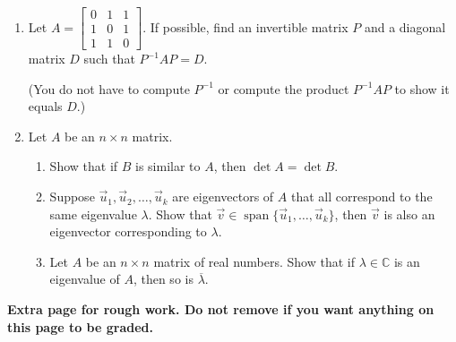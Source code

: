 \documentclass[12pt]{article}
\newcommand{\points}[1]{\marginpar{\hspace{24pt}[#1]}}
\begin{document}
\begin{enumerate}
\item Let $A=\begin{bmatrix}0&1&1\\1&0&1\\1&1&0\end{bmatrix}$.\points{10} If possible, find an invertible matrix $P$ and a diagonal matrix $D$ such that $P^{-1}AP=D$.

(You do not have to compute $P^{-1}$ or compute the product $P^{-1}AP$ to show it equals $D$.)

\newpage

\item Let $A$ be an $n\times n$ matrix.
\begin{enumerate}
 \item Show that if $B$ is similar to $A$, then $\det A = \det B$. \points{3}

\vspace{2in}

 \item Suppose $\vec{u}_1,\vec{u}_2,\ldots, \vec{u}_k$ are eigenvectors of $A$ that all correspond to the same eigenvalue $\lambda$. Show that $\vec{v}\in\operatorname{span}\{\vec{u}_1,\ldots,\vec{u}_k\}$, then $\vec{v}$ is also an eigenvector corresponding to $\lambda$. \points{4}

\vspace{3in}

 \item Let $A$ be an $n\times n$ matrix of real numbers. Show that if $\lambda\in\mathbb{C}$ is an eigenvalue of $A$, then so is $\overline{\lambda}$. \points{3}

\end{enumerate}

\end{enumerate}
\newpage

{\bf Extra page for rough work. Do not remove if you want anything on this page to be graded.}
\end{document}
